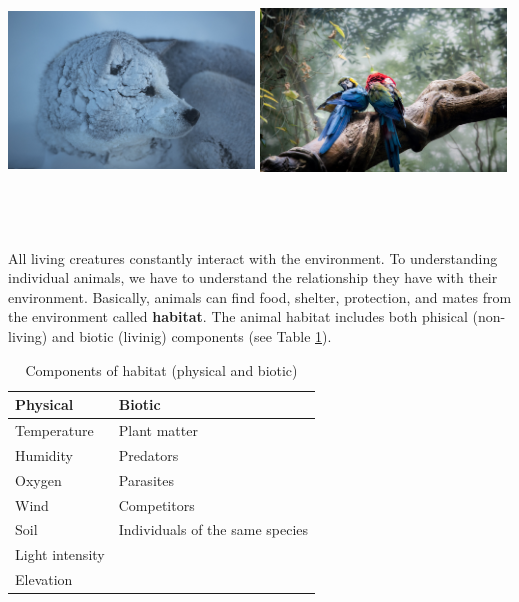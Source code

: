 \documentclass[]{book}
\begin{document}
\includegraphics[width=0.49000\textwidth,height=2.91667in]{figures/polar.jpeg}
\includegraphics[width=0.49000\textwidth,height=2.91667in]{figures/tropical.jpeg}

All living creatures constantly interact with the environment. To
understanding individual animals, we have to understand the relationship
they have with their environment. Basically, animals can find food,
shelter, protection, and mates from the environment called
\textbf{habitat}. The animal habitat includes both phisical (non-living)
and biotic (livinig) components (see Table \ref{tab:habitat}).

\begin{table}

\caption{\label{tab:habitat}Components of habitat (physical and biotic)}
\centering
\begin{tabular}[t]{ll}
\toprule
Physical & Biotic\\
\midrule
Temperature & Plant matter\\
Humidity & Predators\\
Oxygen & Parasites\\
Wind & Competitors\\
Soil & Individuals of the same species\\
\addlinespace
Light intensity & \\
Elevation & \\
\bottomrule
\end{tabular}
\end{table}
\end{document}
